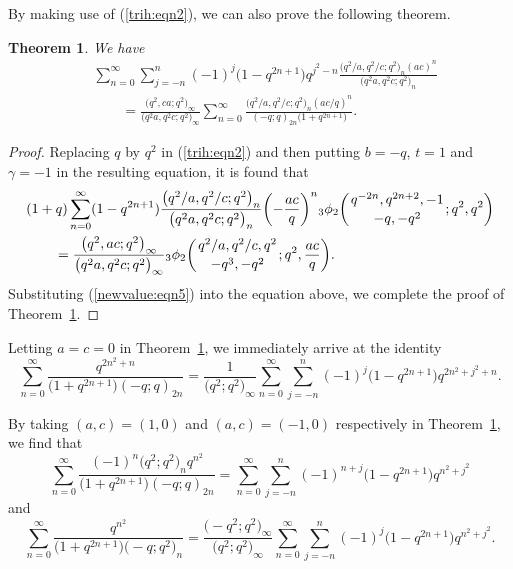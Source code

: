 \documentclass[10pt,a4paper]{amsart}
\numberwithin{equation}{section}
\newtheorem{Theorem}{Theorem}[section]
\begin{document}
By making use of (\ref{trih:eqn2}), we can also prove the following theorem.
\begin{Theorem}\label{mortrianHecke} We have
\begin{align*}%
&\sum_{n=0}^\infty \sum_{j=-n}^n (-1)^j \bigl(1-q^{2n+1}\bigr)q^{j^2-n} \frac{\bigl(q^2/a, q^2/c; q^2\bigr)_n (ac)^n}{\bigl(q^2 a, q^2 c; q^2\bigr)_n}\\
&\qquad{}=\frac{\bigl(q^2, ca; q^2\bigr)_\infty}{\bigl(q^2 a, q^2 c; q^2\bigr)_\infty}
\sum_{n=0}^\infty \frac{\bigl(q^2/a, q^2/c; q^2\bigr)_n (ac/q)^n}{(-q; q)_{2n} \bigl(1+q^{2n+1}\bigr)}.\nonumber
\end{align*}	
\end{Theorem}
\begin{proof} Replacing $q$ by $q^2$ in (\ref{trih:eqn2}) and then putting $b=-q$, $t=1$ and $\gamma=-1$ in the resulting equation, it is found that
\begin{align*}
	&(1+q)\sum_{n=0}^\infty(1-q^{2n+1}) \frac{\bigl(q^2/a, q^2/c; q^2\bigr)_n}{\bigl(q^2a, q^2 c; q^2\bigr)_n} \biggl(-\frac{ac}{q}\biggr)^n {_3\phi_2}\biggl({{q^{-2n}, q^{2n+2}, -1}\atop{-q, -q^2}}; q^2, q^2\biggr)\\
	&\qquad{}=\frac{\bigl(q^2, ac; q^2\bigr)_\infty}{\bigl(q^2a, q^2c; q^2\bigr)_\infty}
	{_3\phi_2}\biggl({{q^2/a, q^2/c, q^2}\atop{-q^3, {-q^2}}}; q^2, \frac{ac}{q}\biggr).\nonumber
\end{align*}		
Substituting (\ref{newvalue:eqn5}) into the equation above, we complete the proof of Theorem~\ref{mortrianHecke}.
\end{proof}

Letting $a=c=0$ in Theorem~\ref{mortrianHecke}, we immediately arrive at the identity
\begin{equation*}%
	\sum_{n=0}^\infty \frac{q^{2n^2+n}}{\bigl(1+q^{2n+1}\bigr) (-q; q)_{2n}}
	=\frac{1}{\bigl(q^2; q^2\bigr)_\infty}\sum_{n=0}^\infty \sum_{j=-n}^n (-1)^j
	\bigl(1-q^{2n+1}\bigr)q^{2n^2+j^2+n}.
\end{equation*}

By taking $(a, c)=(1, 0)$ and $(a, c)=(-1, 0)$ respectively in Theorem~\ref{mortrianHecke}, we find that
\begin{equation*}%
	\sum_{n=0}^\infty \frac{(-1)^n \bigl(q^2; q^2\bigr)_n q^{n^2}}{\bigl(1+q^{2n+1}\bigr) (-q; q)_{2n}}
	=\sum_{n=0}^\infty \sum_{j=-n}^n (-1)^{n+j}
	\bigl(1-q^{2n+1}\bigr)q^{n^2+j^2}
\end{equation*}
and
\begin{equation*}%
	\sum_{n=0}^\infty \frac{ q^{n^2}}{\bigl(1+q^{2n+1}\bigr) \bigl(-q; q^2\bigr)_{n}}
	=\frac{\bigl(-q^2; q^2\bigr)_\infty}{\bigl(q^2; q^2\bigr)_\infty}\sum_{n=0}^\infty \sum_{j=-n}^n (-1)^{j}
	\bigl(1-q^{2n+1}\bigr)q^{n^2+j^2}.
	\end{equation*}
\end{document}
